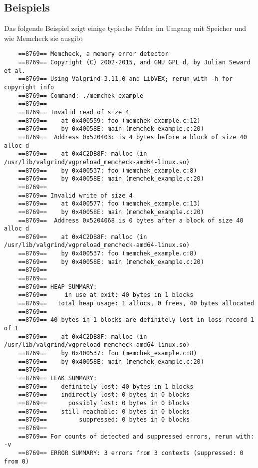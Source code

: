 \subsection{Beispiels}
Das folgende Beispiel zeigt einige typische Fehler im Umgang mit Speicher und wie Memcheck sie ausgibt
\begin{singlespace}
\begin{scriptsize}


\begin{lstlisting}
	==8769== Memcheck, a memory error detector
	==8769== Copyright (C) 2002-2015, and GNU GPL d, by Julian Seward et al.
	==8769== Using Valgrind-3.11.0 and LibVEX; rerun with -h for copyright info
	==8769== Command: ./memchek_example
	==8769== 
	==8769== Invalid read of size 4
	==8769==    at 0x400559: foo (memchek_example.c:12)
	==8769==    by 0x40058E: main (memchek_example.c:20)
	==8769==  Address 0x520403c is 4 bytes before a block of size 40 alloc d
	==8769==    at 0x4C2DB8F: malloc (in /usr/lib/valgrind/vgpreload_memcheck-amd64-linux.so)
	==8769==    by 0x400537: foo (memchek_example.c:8)
	==8769==    by 0x40058E: main (memchek_example.c:20)
	==8769== 
	==8769== Invalid write of size 4
	==8769==    at 0x400577: foo (memchek_example.c:13)
	==8769==    by 0x40058E: main (memchek_example.c:20)
	==8769==  Address 0x5204068 is 0 bytes after a block of size 40 alloc d
	==8769==    at 0x4C2DB8F: malloc (in /usr/lib/valgrind/vgpreload_memcheck-amd64-linux.so)
	==8769==    by 0x400537: foo (memchek_example.c:8)
	==8769==    by 0x40058E: main (memchek_example.c:20)
	==8769== 
	==8769== 
	==8769== HEAP SUMMARY:
	==8769==     in use at exit: 40 bytes in 1 blocks
	==8769==   total heap usage: 1 allocs, 0 frees, 40 bytes allocated
	==8769== 
	==8769== 40 bytes in 1 blocks are definitely lost in loss record 1 of 1
	==8769==    at 0x4C2DB8F: malloc (in /usr/lib/valgrind/vgpreload_memcheck-amd64-linux.so)
	==8769==    by 0x400537: foo (memchek_example.c:8)
	==8769==    by 0x40058E: main (memchek_example.c:20)
	==8769== 
	==8769== LEAK SUMMARY:
	==8769==    definitely lost: 40 bytes in 1 blocks
	==8769==    indirectly lost: 0 bytes in 0 blocks
	==8769==      possibly lost: 0 bytes in 0 blocks
	==8769==    still reachable: 0 bytes in 0 blocks
	==8769==         suppressed: 0 bytes in 0 blocks
	==8769== 
	==8769== For counts of detected and suppressed errors, rerun with: -v
	==8769== ERROR SUMMARY: 3 errors from 3 contexts (suppressed: 0 from 0)
	
\end{lstlisting}
\end{scriptsize}
\end{singlespace}

